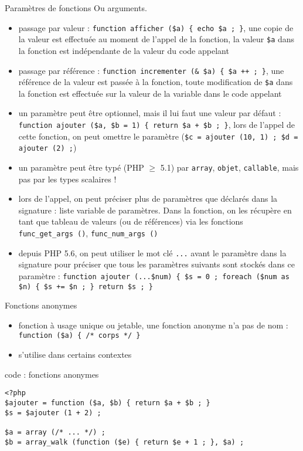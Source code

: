 \begin{frame}[containsverbatim]{Paramètres de fonctions}
Ou arguments.
\begin{itemize}
\item passage par valeur : \lstinline!function afficher ($a) { echo $a ; }!, une copie de la valeur est effectuée au moment de l'appel de la fonction, la valeur \texttt{\$a} dans la fonction est indépendante de la valeur du code appelant
\item passage par référence : \lstinline!function incrementer (& $a) { $a ++ ; }!, une référence de la valeur est passée à la fonction, toute modification de \texttt{\$a} dans la fonction est effectuée sur la valeur de la variable dans le code appelant
\item un paramètre peut être optionnel, mais il lui faut une valeur par défaut : \lstinline!function ajouter ($a, $b = 1) { return $a + $b ; }!, lors de l'appel de cette fonction, on peut omettre le paramètre (\lstinline!$c = ajouter (10, 1) ; $d = ajouter (2) ;!)
\item un paramètre peut être typé (PHP $\ge$ 5.1) par \texttt{array}, \texttt{objet}, \texttt{callable}, mais pas par les types scalaires !
\item lors de l'appel, on peut préciser plus de paramètres que déclarés dans la signature : liste variable de paramètres. Dans la fonction, on les récupère en tant que tableau de valeurs (ou de références) via les fonctions \texttt{func\_get\_args ()}, \texttt{func\_num\_args ()}
\item depuis PHP 5.6, on peut utiliser le mot clé \texttt{...} avant le paramètre dans la signature pour préciser que tous les paramètres suivants sont stockés dans ce paramètre : \lstinline!function ajouter (...$num) { $s = 0 ; foreach ($num as $n) { $s += $n ; } return $s ; }! 
\end{itemize}
\end{frame}

\begin{frame}[containsverbatim]{Fonctions anonymes} %
\begin{itemize}
\item fonction à usage unique ou jetable, une fonction anonyme n'a pas de nom : \lstinline!function ($a) { /* corps */ }!
\item s'utilise dans certains contextes
\end{itemize}
\begin{block}{code : fonctions anonymes}
\begin{lstlisting}
<?php
$ajouter = function ($a, $b) { return $a + $b ; }
$s = $ajouter (1 + 2) ;

$a = array (/* ... */) ;
$b = array_walk (function ($e) { return $e + 1 ; }, $a) ;
\end{lstlisting}
\end{block}
\end{frame}


